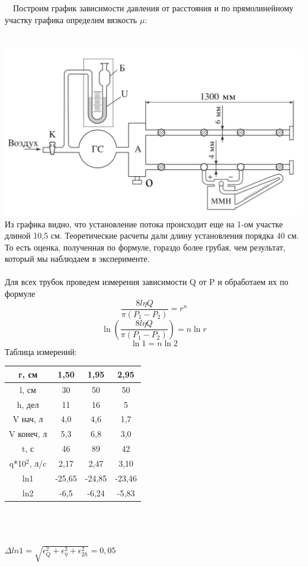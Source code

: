 \documentclass[11pt]{article}
\begin{document}
\ \ Построим график зависимости давления от расстояния и по прямолинейному участку графика определим вязкость $\mu$: \\
\ \\
\ \\
\includegraphics[scale=0.53]{asd.png}
\newpage
Из графика видно, что установление потока происходит еще на 1-ом участке длиной 10,5 см. Теоретические расчеты дали длину установления порядка 40 см. То есть оценка, полученная по формуле, гораздо более грубая, чем результат, который мы наблюдаем в эксперименте.
\ \\
\ \\
\indent Для всех трубок проведем измерения зависимости Q от P и обработаем их по формуле 
$$\frac{8l\eta Q}{\pi(P_1-P_2)}=r^n$$
$$\ln(\frac{8l\eta Q}{\pi(P_1-P_2)})=n\ln r$$
$$\ln1=n\ln2$$
\indent Таблица измерений: \\
\begin{tabular}{|c|c|c|c|}
\hline 
r, см & 1,50 & 1,95 & 2,95 \\ 
\hline 
l, см & 30 & 50 & 50 \\ 
\hline 
h, дел & 11 & 16 & 5 \\ 
\hline 
V нач, л & 4,0 & 4,6 & 1,7 \\ 
\hline 
V конеч, л & 5,3 & 6,8 & 3,0 \\ 
\hline 
t, с & 46 & 89 & 42 \\ 
\hline 
q*10$^2$, л/c & 2,17 & 2,47 & 3,10 \\ 
\hline 
ln1 & -25,65 & -24,85 & -23,46 \\ 
\hline 
ln2 & -6,5 & -6,24 & -5,83 \\ 
\hline 
\end{tabular}
\ \\
\ \\
\ \\
$\Delta ln1 = \sqrt{\epsilon_Q^2+\epsilon_\eta^2+\epsilon_{2h}^2}=0,05$\\
\end{document}

